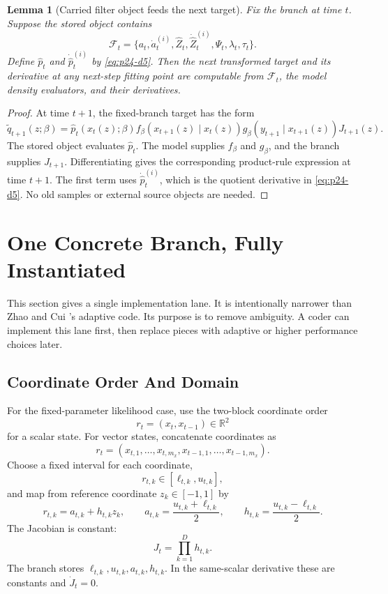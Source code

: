 \documentclass[11pt]{article}
\newtheorem{lemma}{Lemma}
\newcommand{\R}{\mathbb R}
\begin{document}
\begin{lemma}[Carried filter object feeds the next target]
Fix the branch at time \(t\).  Suppose the stored object contains
\[
    \mathcal F_t
    =
    \{a_t,\dot a_t^{(i)},\widehat Z_t,\dot{\widehat Z}_t^{(i)},
      \Psi_t,\lambda_t,\tau_t\}.
\]
Define \(\widehat p_t\) and \(\dot{\widehat p}_t^{(i)}\) by \eqref{eq:p24-d5}.  Then the
next transformed target and its derivative at any next-step fitting point are
computable from \(\mathcal F_t\), the model density evaluators, and their
derivatives.
\end{lemma}

\begin{proof}
At time \(t+1\), the fixed-branch target has the form
\[
    \widetilde q_{t+1}(z;\beta)
    =
    \widehat p_t(x_t(z);\beta)
    f_\beta(x_{t+1}(z)\mid x_t(z))
    g_\beta(y_{t+1}\mid x_{t+1}(z))
    J_{t+1}(z).
\]
The stored object evaluates \(\widehat p_t\).  The model supplies \(f_\beta\)
and \(g_\beta\), and the branch supplies \(J_{t+1}\).  Differentiating gives
the corresponding product-rule expression at time \(t+1\).  The first
term uses \(\dot{\widehat p}_t^{(i)}\), which is the quotient derivative in
\eqref{eq:p24-d5}.  No old samples or external source objects are needed.
\end{proof}

\section{One Concrete Branch, Fully Instantiated}

This section gives a single implementation lane.  It is intentionally narrower
than Zhao and Cui \cite{zhao2024ttsequential}'s adaptive code.  Its purpose is to remove ambiguity.  A coder
can implement this lane first, then replace pieces with adaptive or higher
performance choices later.

\subsection{Coordinate Order And Domain}

For the fixed-parameter likelihood case, use the two-block coordinate order
\[
    r_t=(x_t,x_{t-1})\in\R^2
\]
for a scalar state.  For vector states, concatenate coordinates as
\[
    r_t=(x_{t,1},\ldots,x_{t,m_x},x_{t-1,1},\ldots,x_{t-1,m_x}).
\]
Choose a fixed interval for each coordinate,
\[
    r_{t,k}\in[\ell_{t,k},u_{t,k}],
\]
and map from reference coordinate \(z_k\in[-1,1]\) by
\[
    r_{t,k}=a_{t,k}+h_{t,k}z_k,\qquad
    a_{t,k}=\frac{u_{t,k}+\ell_{t,k}}2,\qquad
    h_{t,k}=\frac{u_{t,k}-\ell_{t,k}}2.
    \label{eq:p24-c1}
\]
The Jacobian is constant:
\[
    J_t=\prod_{k=1}^{D}h_{t,k}.
    \label{eq:p24-c2}
\]
The branch stores \(\ell_{t,k},u_{t,k},a_{t,k},h_{t,k}\).  In the same-scalar
derivative these are constants and \(\dot J_t=0\).
\end{document}
